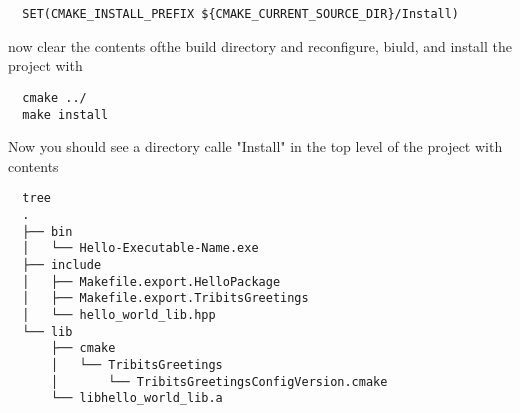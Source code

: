 \documentclass[12pt]{article}
\begin{document}
\begin{verbatim}
  SET(CMAKE_INSTALL_PREFIX ${CMAKE_CURRENT_SOURCE_DIR}/Install)
\end{verbatim}

now clear the contents ofthe build directory and reconfigure, biuld,
and install the project with

\begin{verbatim}
  cmake ../
  make install
\end{verbatim}

Now you should see a directory calle "Install" in the top level of the
project with contents

\begin{verbatim}
  tree
  .
  ├── bin
  │   └── Hello-Executable-Name.exe
  ├── include
  │   ├── Makefile.export.HelloPackage
  │   ├── Makefile.export.TribitsGreetings
  │   └── hello_world_lib.hpp
  └── lib
      ├── cmake
      │   └── TribitsGreetings
      │       └── TribitsGreetingsConfigVersion.cmake
      └── libhello_world_lib.a
\end{verbatim}


\end{document}
